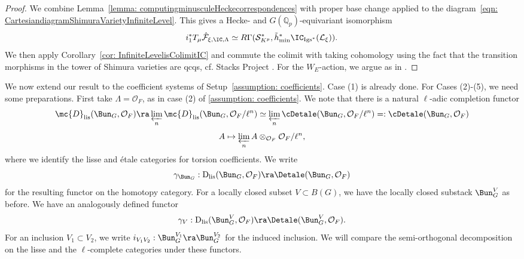 \documentclass[letterpaper,11pt]{amsart}
\begin{document}
\begin{proof} We combine Lemma~\ref{lemma: computingminusculeHeckecorrespondences} with proper base change applied to the diagram~\eqref{eqn: CartesiandiagramShimuraVarietyInfiniteLevel}. This gives a Hecke- and $G(\mathbb{Q}_p)$-equivariant isomorphism
\[
i_1^*T_{\mu}\hat{\mathcal{F}}_{\xi,\IC,\Lambda} \simeq R\Gamma(\mathcal{S}^*_{K^p}, \tilde{h}_{\min}^*\IC_{\mathrm{Igs}^*}(\mathcal{L}_{\xi})). 
\]
We then apply Corollary~\ref{cor: InfiniteLevelisColimitIC} and commute the colimit with taking cohomology using the fact that the transition morphisms in the tower of Shimura varieties are qcqs, cf. Stacks Project \cite[Tag~073E]{stacks-project}. For the $W_{E}$-action, we argue as in \cite[Theorem 8.4.10]{DvHKZ}.
\end{proof}
We now extend our result to the coefficient systems of Setup~\ref{assumption: coefficients}. Case (1) is already done. For Cases (2)-(5), we need some preparations. First take $\Lambda = \mathcal{O}_{F}$, as in case (2) of \ref{assumption: coefficients}. We note that there is a natural $\ell$-adic completion functor
\[ 
\mc{D}_{\mathrm{lis}}(\Bun_{G},\mathcal{O}_{F}) \ra \varprojlim_{n} \mc{D}_{\mathrm{lis}}(\Bun_{G},\mathcal{O}_{F}/\ell^{n}) \simeq \varprojlim_{n} \cDetale(\Bun_{G},\mathcal{O}_{F}/\ell^{n}) =: \cDetale(\Bun_{G},\mathcal{O}_{F})
\] 
\[ A \mapsto \varprojlim_{n} A \otimes_{\mathcal{O}_{F}} \mathcal{O}_{F}/\ell^{n},\]
where we identify the lisse and \'etale categories for torsion coefficients. We write 
\begin{equation}{\label{eqn: lcompletinglissesheaves}}
\gamma_{\Bun_{G}}: \mathrm{D}_{\mathrm{lis}}(\Bun_{G},\mathcal{O}_{F}) \ra \Detale(\Bun_{G},\mathcal{O}_{F})
\end{equation}
for the resulting functor on the homotopy category. For a locally closed subset $V \subset B(G)$, we have the locally closed substack $\Bun_{G}^{V}$ as before. We have an analogously defined functor
\[ \gamma_{V}: \mathrm{D}_{\mathrm{lis}}(\Bun_{G}^{V},\mathcal{O}_{F}) \ra \Detale(\Bun_{G}^{V},\mathcal{O}_{F}).\]
For an inclusion $V_{1} \subset V_{2}$, we write $i_{V_{1}V_{2}}: \Bun_{G}^{V_{1}} \ra \Bun_{G}^{V_{2}}$ for the induced inclusion. We will compare the semi-orthogonal decomposition on the lisse and the $\ell$-complete categories under these functors.
\end{document}
